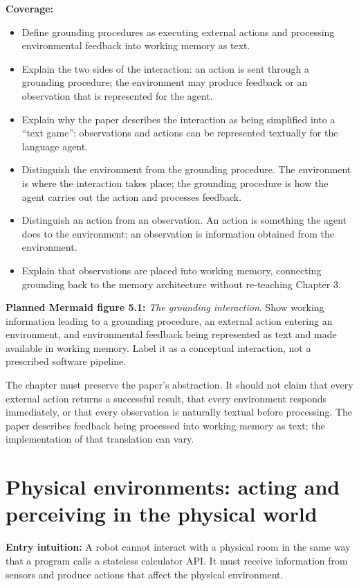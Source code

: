 \textbf{Coverage:}
\begin{itemize}
  \item Define grounding procedures as executing external actions and processing environmental feedback into working memory as text.
  \item Explain the two sides of the interaction: an action is sent through a grounding procedure; the environment may produce feedback or an observation that is represented for the agent.
  \item Explain why the paper describes the interaction as being simplified into a ``text game'': observations and actions can be represented textually for the language agent.
  \item Distinguish the environment from the grounding procedure. The environment is where the interaction takes place; the grounding procedure is how the agent carries out the action and processes feedback.
  \item Distinguish an action from an observation. An action is something the agent does to the environment; an observation is information obtained from the environment.
  \item Explain that observations are placed into working memory, connecting grounding back to the memory architecture without re-teaching Chapter 3.
\end{itemize}

\textbf{Planned Mermaid figure 5.1:} \emph{The grounding interaction}. Show working information leading to a grounding procedure, an external action entering an environment, and environmental feedback being represented as text and made available in working memory. Label it as a conceptual interaction, not a prescribed software pipeline.

\begin{notebox}
The chapter must preserve the paper's abstraction. It should not claim that every external action returns a successful result, that every environment responds immediately, or that every observation is naturally textual before processing. The paper describes feedback being processed into working memory as text; the implementation of that translation can vary.
\end{notebox}

\section{Physical environments: acting and perceiving in the physical world}
\textbf{Entry intuition:} A robot cannot interact with a physical room in the same way that a program calls a stateless calculator API. It must receive information from sensors and produce actions that affect the physical environment.

